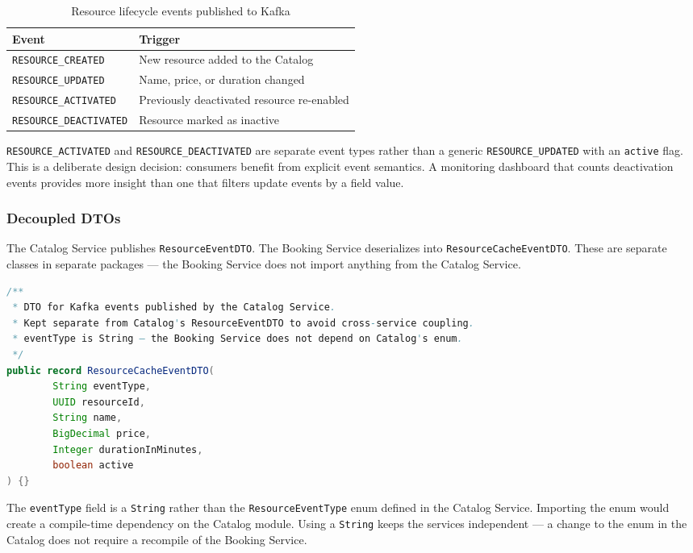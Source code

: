 \begin{table}[H]
\centering
\begin{tabular}{ll}
\toprule
\textbf{Event} & \textbf{Trigger} \\
\midrule
\texttt{RESOURCE\_CREATED} & New resource added to the Catalog \\
\texttt{RESOURCE\_UPDATED} & Name, price, or duration changed \\
\texttt{RESOURCE\_ACTIVATED} & Previously deactivated resource re-enabled \\
\texttt{RESOURCE\_DEACTIVATED} & Resource marked as inactive \\
\bottomrule
\end{tabular}
\caption{Resource lifecycle events published to Kafka}
\end{table}

\texttt{RESOURCE\_ACTIVATED} and \texttt{RESOURCE\_DEACTIVATED} are separate event types rather than a generic \texttt{RESOURCE\_UPDATED} with an \texttt{active} flag. This is a deliberate design decision: consumers benefit from explicit event semantics. A monitoring dashboard that counts deactivation events provides more insight than one that filters update events by a field value.

\subsubsection{Decoupled DTOs}

The Catalog Service publishes \texttt{ResourceEventDTO}. The Booking Service deserializes into \texttt{ResourceCacheEventDTO}. These are separate classes in separate packages --- the Booking Service does not import anything from the Catalog Service.

\begin{lstlisting}[style=javastyle, language=Java, caption={ResourceCacheEventDTO in the Booking Service}]
/**
 * DTO for Kafka events published by the Catalog Service.
 * Kept separate from Catalog's ResourceEventDTO to avoid cross-service coupling.
 * eventType is String — the Booking Service does not depend on Catalog's enum.
 */
public record ResourceCacheEventDTO(
        String eventType,
        UUID resourceId,
        String name,
        BigDecimal price,
        Integer durationInMinutes,
        boolean active
) {}
\end{lstlisting}

The \texttt{eventType} field is a \texttt{String} rather than the \texttt{ResourceEventType} enum defined in the Catalog Service. Importing the enum would create a compile-time dependency on the Catalog module. Using a \texttt{String} keeps the services independent --- a change to the enum in the Catalog does not require a recompile of the Booking Service.

